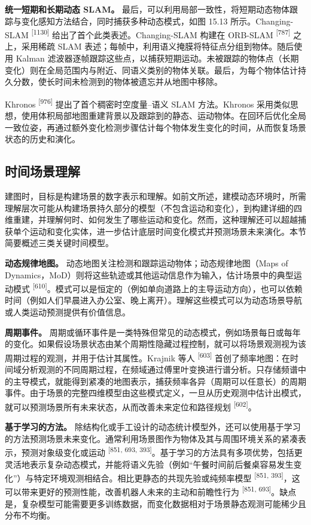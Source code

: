 \textbf{统一短期和长期动态 SLAM。} 最后，可以利用局部一致性，将短期动态物体跟踪与变化感知方法结合，同时捕获多种动态模式，如图 15.13 所示。Changing-SLAM \textsuperscript{[1130]} 给出了首个此类表述。Changing-SLAM 构建在 ORB-SLAM \textsuperscript{[787]} 之上，采用稀疏 SLAM 表述；每帧中，利用语义掩膜将特征点分组到物体。随后使用 Kalman 滤波器逐帧跟踪这些点，以捕获短期运动。未被跟踪的物体点（长期变化）则在全局范围内与附近、同语义类别的物体关联。最后，为每个物体估计持久分数，使长时间未检测到的物体被遗忘并从地图中移除。

Khronos \textsuperscript{[976]} 提出了首个稠密时空度量--语义 SLAM 方法。Khronos 采用类似思想，使用体积局部地图重建背景以及跟踪到的静态、运动物体。在回环后优化全局一致位姿，再通过额外变化检测步骤估计每个物体发生变化的时间，从而恢复场景状态的历史和演化。

\subsection{时间场景理解}

建图时，目标是构建场景的数字表示和理解。如前文所述，建模动态环境时，所需理解层次可能从构建场景持久部分的模型（不包含运动和变化），到构建详细的四维重建，并理解何时、如何发生了哪些运动和变化。然而，这种理解还可以超越捕获单个运动和变化实体，进一步估计底层时间变化模式并预测场景未来演化。本节简要概述三类关键时间模型。

\textbf{动态规律地图。} 动态地图关注检测和跟踪运动物体；动态规律地图（Maps of Dynamics，MoD）则将这些轨迹或其他运动信息作为输入，估计场景中的典型运动模式 \textsuperscript{[610]}。模式可以是恒定的（例如单向道路上的主导运动方向），也可以依赖时间（例如人们早晨进入办公室、晚上离开）。理解这些模式可以为动态场景导航或人类运动预测提供有价值信息。

\textbf{周期事件。} 周期或循环事件是一类特殊但常见的动态模式，例如场景每日或每年的变化。如果假设场景状态由某个周期性隐藏过程控制，就可以将场景观测视为该周期过程的观测，并用于估计其属性。Krajnik 等人 \textsuperscript{[603]} 首创了频率地图：在时间域分析观测的不同周期过程，在频域通过傅里叶变换进行谱分析。只存储频谱中的主导模式，就能得到紧凑的地图表示，捕获频率各异（周期可以任意长）的周期事件。由于场景的完整四维模型由这些模式定义，一旦从历史观测中估计出模式，就可以预测场景所有未来状态，从而改善未来定位和路径规划 \textsuperscript{[602]}。

\textbf{基于学习的方法。} 除结构化或手工设计的动态统计模型外，还可以使用基于学习的方法预测场景未来变化。通常利用场景图作为物体及其与周围环境关系的紧凑表示，预测对象级变化或运动 \textsuperscript{[851, 693, 393]}。基于学习的方法具有多项优势，包括更灵活地表示复杂动态模式，并能将语义先验（例如“午餐时间前后餐桌容易发生变化”）与特定环境观测相结合。相比更静态的共现先验或纯频率模型 \textsuperscript{[851, 393]}，这可以带来更好的预测性能，改善机器人未来的主动和前瞻性行为 \textsuperscript{[851, 693]}。缺点是，复杂模型可能需要更多训练数据，而变化数据相对于场景静态观测可能稀少且分布不均衡。

